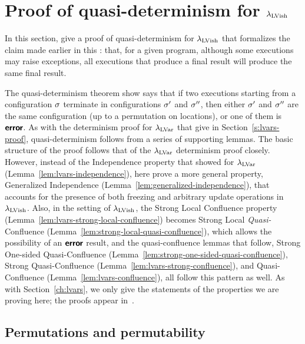 \section{Proof of quasi-determinism for $\lambda_{\textrm{LVish}}$}\label{s:quasi-proof-of-quasi-determinism}

In this section,  give a proof of quasi-determinism for
$\lambda_{\textrm{LVish}}$ that formalizes the claim made earlier in this :
that, for a given program, although some executions may raise
exceptions, all executions that produce a final result will produce
the same final result.

The quasi-determinism theorem  show says that if two executions
starting from a configuration $\sigma$ terminate in configurations
$\sigma'$ and $\sigma''$, then either $\sigma'$ and $\sigma''$ are the
same configuration (up to a permutation on locations), or one of them
is $\textbf{\textsf{error}}$.  As with the determinism proof for $\lambda_{\textrm{LVar}}$ that 
give in Section~\ref{s:lvars-proof}, quasi-determinism follows from a
series of supporting lemmas.  The basic structure of the proof follows
that of the $\lambda_{\textrm{LVar}}$ determinism proof closely.  However, instead
of the Independence property that  showed for $\lambda_{\textrm{LVar}}$
(Lemma~\ref{lem:lvars-independence}), here  prove a more general property,
Generalized Independence (Lemma~\ref{lem:generalized-independence}),
that accounts for the presence of both freezing and arbitrary update
operations in $\lambda_{\textrm{LVish}}$.  Also, in the setting of $\lambda_{\textrm{LVish}}$,
the Strong Local Confluence property
(Lemma~\ref{lem:lvars-strong-local-confluence}) becomes Strong Local
\emph{Quasi-}Confluence
(Lemma~\ref{lem:strong-local-quasi-confluence}), which allows the
possibility of an $\textbf{\textsf{error}}$ result, and the quasi-confluence lemmas
that follow, Strong One-sided Quasi-Confluence
(Lemma~\ref{lem:strong-one-sided-quasi-confluence}), Strong
Quasi-Confluence (Lemma~\ref{lem:lvars-strong-confluence}), and
Quasi-Confluence (Lemma~\ref{lem:lvars-confluence}), all follow this
pattern as well.
\ifdefined\JOURNAL
As with Section~\ref{ch:lvars}, we only give the statements of the
properties we are proving here; the proofs appear
in~\cite{lvars-dissertation}.
\fi

\subsection{Permutations and permutability}\label{subsection:quasi-permutations}

